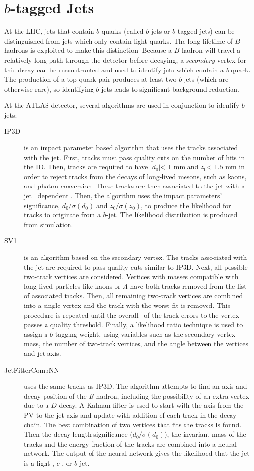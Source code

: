 \section{$b$-tagged Jets}
At the LHC, jets that contain $b$-quarks (called $b$-jets or $b$-tagged jets) can be distinguished from jets which only contain light quarks\cite{btagcom,btagptrel}. The long lifetime of $B$-hadrons is exploited to make this distinction. Because a $B$-hadron will travel a relatively long path through the detector before decaying, a \emph{secondary} vertex for this decay can be reconstructed and used to identify jets which contain a $b$-quark. The production of a top quark pair produces at least two $b$-jets (which are otherwise rare), so identifying $b$-jets leads to significant background reduction. 

At the ATLAS detector, several algorithms are used in conjunction to identify $b$-jets:
\begin{description}
\item[IP3D] is an impact parameter based algorithm that uses the tracks associated with the jet. First, tracks must pass quality cuts on the number of hits in the ID. Then, tracks are required to have $|d_0|$< 1 mm and $z_0$< 1.5 mm in order to reject tracks from the decays of long-lived mesons, such as kaons, and photon conversion. These tracks are then associated to the jet with a jet \pt\ dependent \dR. Then, the algorithm uses the impact parameters' significance, $d_0/\sigma(d_0)$ and $z_0/\sigma(z_0)$, to produce the likelihood for tracks to originate from a $b$-jet. The likelihood distribution is produced from simulation.
\item[SV1] is an algorithm based on the secondary vertex. The tracks associated with the jet are required to pass quality cuts similar to IP3D. Next, all possible two-track vertices are considered. Vertices with masses compatible with long-lived particles like kaons or $\Lambda$ have both tracks removed from the list of associated tracks. Then, all remaining two-track vertices are combined into a single vertex and the track with the worst fit is removed. This procedure is repeated until the overall \chisq\ of the track errors to the vertex passes a quality threshold. Finally, a likelihood ratio technique is used to assign a $b$-tagging weight, using variables such as the secondary vertex mass, the number of two-track vertices, and the angle between the vertices and jet axis.

\item[JetFitterCombNN] uses the same tracks as IP3D. The algorithm attempts to find an axis and decay position of the $B$-hadron, including the possibility of an extra vertex due to a $D$-decay. A Kalman filter is used to start with the axis from the PV to the jet axis and update with addition of each track in the decay chain. The best combination of two vertices that fits the tracks is found. Then the decay length significance ($d_0/\sigma(d_0)$), the invariant mass of the tracks and the energy fraction of the tracks are combined into a neural network. The output of the neural network gives the likelihood that the jet is a light-, $c$-, or $b$-jet.
\end{description}




